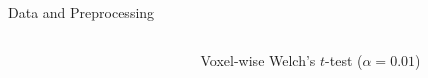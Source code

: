 \documentclass[aspectratio=169,xcolor={table, dvipsnames}]{beamer}
\begin{document}
\begin{frame}{Data and Preprocessing}
	\begin{columns}
		\begin{column}{0.5\textwidth}
			\begin{figure}
				
			\end{figure}
		\end{column}
		\begin{column}{0.5\textwidth}
			\begin{figure}
				\caption*{Voxel-wise Welch's $t$-test ($\alpha = 0.01$)}\label{fig:ttest}
			\end{figure}
		\end{column}
	\end{columns}
\end{frame}
\end{document}
